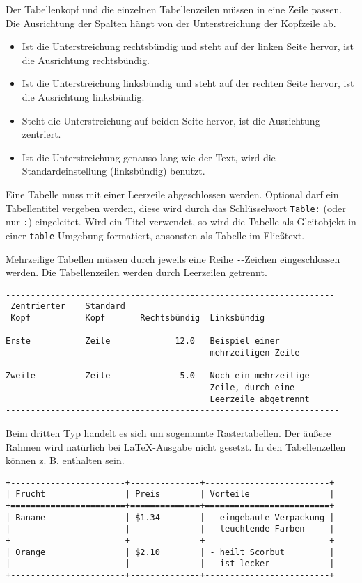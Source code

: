 \documentclass[11pt,ngerman,a4paper]{article}
\begin{document}
Der Tabellenkopf und die einzelnen Tabellenzeilen müssen in eine Zeile
passen. Die Ausrichtung der Spalten hängt von der Unterstreichung der
Kopfzeile ab.

\begin{itemize}
\item
  Ist die Unterstreichung rechtsbündig und steht auf der linken Seite
  hervor, ist die Ausrichtung rechtsbündig.
\item
  Ist die Unterstreichung linksbündig und steht auf der rechten Seite
  hervor, ist die Ausrichtung linksbündig.
\item
  Steht die Unterstreichung auf beiden Seite hervor, ist die Ausrichtung
  zentriert.
\item
  Ist die Unterstreichung genauso lang wie der Text, wird die
  Standardeinstellung (linksbündig) benutzt.
\end{itemize}

Eine Tabelle muss mit einer Leerzeile abgeschlossen werden. Optional
darf ein Tabellentitel vergeben werden, diese wird durch das
Schlüsselwort \texttt{Table:} (oder nur \texttt{:}) eingeleitet. Wird
ein Titel verwendet, so wird die Tabelle als Gleitobjekt in einer
\texttt{table}-Umgebung formatiert, ansonsten als Tabelle im Fließtext.

Mehrzeilige Tabellen müssen durch jeweils eine Reihe \texttt{-}-Zeichen
eingeschlossen werden. Die Tabellenzeilen werden durch Leerzeilen
getrennt.

\begin{verbatim}
------------------------------------------------------------------
 Zentrierter    Standard    
 Kopf           Kopf       Rechtsbündig  Linksbündig
-------------   --------  -------------  ---------------------
Erste           Zeile             12.0   Beispiel einer 
                                         mehrzeiligen Zeile

Zweite          Zeile              5.0   Noch ein mehrzeilige
                                         Zeile, durch eine
                                         Leerzeile abgetrennt
-------------------------------------------------------------------
\end{verbatim}

Beim dritten Typ handelt es sich um sogenannte Rastertabellen. Der
äußere Rahmen wird natürlich bei LaTeX-Ausgabe nicht gesetzt. In den
Tabellenzellen können z. B. enthalten sein.

\begin{verbatim}
+-----------------------+--------------+-------------------------+
| Frucht                | Preis        | Vorteile                |
+=======================+==============+=========================+
| Banane                | $1.34        | - eingebaute Verpackung |
|                       |              | - leuchtende Farben     |
+-----------------------+--------------+-------------------------+
| Orange                | $2.10        | - heilt Scorbut         |
|                       |              | - ist lecker            |
+-----------------------+--------------+-------------------------+
\end{verbatim}
\end{document}
